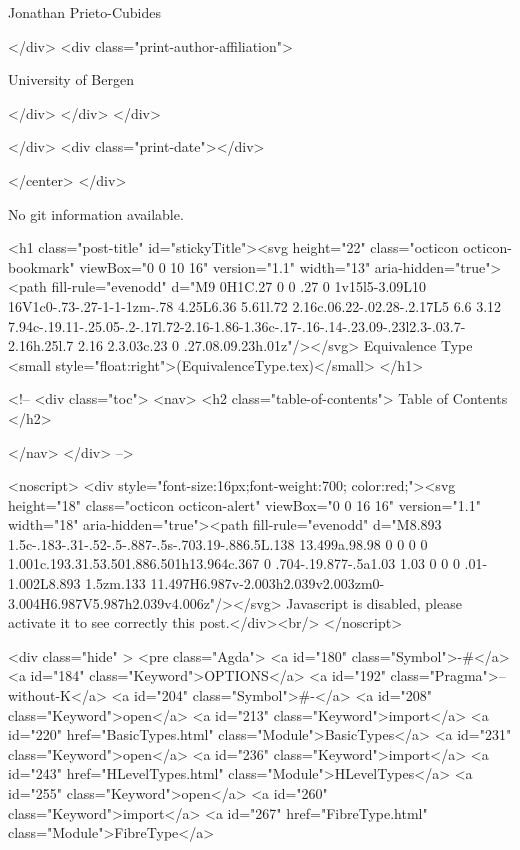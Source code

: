                   Jonathan Prieto-Cubides
                
              </div>
              <div class="print-author-affiliation">
                
                  University of Bergen
                
                </div>
            </div>
          </div>
          
          
        </div>
        <div class="print-date"></div>
        
        
    </center>
  </div>

  
  No git information available.
  

  <h1 class="post-title" id="stickyTitle"><svg height="22" class="octicon octicon-bookmark" viewBox="0 0 10 16" version="1.1" width="13" aria-hidden="true"><path fill-rule="evenodd" d="M9 0H1C.27 0 0 .27 0 1v15l5-3.09L10 16V1c0-.73-.27-1-1-1zm-.78 4.25L6.36 5.61l.72 2.16c.06.22-.02.28-.2.17L5 6.6 3.12 7.94c-.19.11-.25.05-.2-.17l.72-2.16-1.86-1.36c-.17-.16-.14-.23.09-.23l2.3-.03.7-2.16h.25l.7 2.16 2.3.03c.23 0 .27.08.09.23h.01z"/></svg> Equivalence Type <small style="float:right">(EquivalenceType.tex)</small>
  </h1>

  <!-- 
  <div class="toc">
    <nav>
    <h2 class="table-of-contents"> Table of Contents </h2>
      

    </nav>
  </div>
   -->

  <noscript>
  <div style="font-size:16px;font-weight:700; color:red;"><svg height="18" class="octicon octicon-alert" viewBox="0 0 16 16" version="1.1" width="18" aria-hidden="true"><path fill-rule="evenodd" d="M8.893 1.5c-.183-.31-.52-.5-.887-.5s-.703.19-.886.5L.138 13.499a.98.98 0 0 0 0 1.001c.193.31.53.501.886.501h13.964c.367 0 .704-.19.877-.5a1.03 1.03 0 0 0 .01-1.002L8.893 1.5zm.133 11.497H6.987v-2.003h2.039v2.003zm0-3.004H6.987V5.987h2.039v4.006z"/></svg> Javascript is disabled, please activate it to see correctly this post.</div><br/>
  </noscript>

  <div class="hide" >
<pre class="Agda">
<a id="180" class="Symbol">{-#</a> <a id="184" class="Keyword">OPTIONS</a> <a id="192" class="Pragma">--without-K</a> <a id="204" class="Symbol">#-}</a>
<a id="208" class="Keyword">open</a> <a id="213" class="Keyword">import</a> <a id="220" href="BasicTypes.html" class="Module">BasicTypes</a>
<a id="231" class="Keyword">open</a> <a id="236" class="Keyword">import</a> <a id="243" href="HLevelTypes.html" class="Module">HLevelTypes</a>
<a id="255" class="Keyword">open</a> <a id="260" class="Keyword">import</a> <a id="267" href="FibreType.html" class="Module">FibreType</a>

